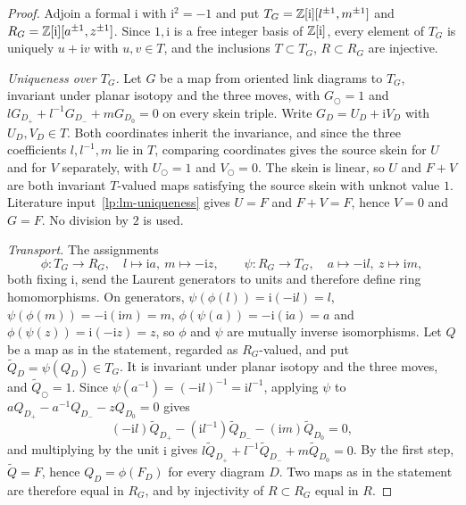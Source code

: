 \begin{proof}
Adjoin a formal $\mathrm i$ with $\mathrm i^2=-1$ and put
$T_G=\mathbb Z[\mathrm i][l^{\pm1},m^{\pm1}]$ and
$R_G=\mathbb Z[\mathrm i][a^{\pm1},z^{\pm1}]$. Since $1,\mathrm i$ is a free
integer basis of $\mathbb Z[\mathrm i]$, every element of $T_G$ is uniquely
$u+\mathrm iv$ with $u,v\in T$, and the inclusions $T\subset T_G$,
$R\subset R_G$ are injective.

\emph{Uniqueness over $T_G$.} Let $G$ be a map from oriented link diagrams
to $T_G$, invariant under planar isotopy and the three moves, with
$G_{\bigcirc}=1$ and $lG_{D_+}+l^{-1}G_{D_-}+mG_{D_0}=0$ on every skein
triple. Write $G_D=U_D+\mathrm iV_D$ with $U_D,V_D\in T$. Both coordinates
inherit the invariance, and since the three coefficients $l,l^{-1},m$ lie
in $T$, comparing coordinates gives the source skein for $U$ and for $V$
separately, with $U_{\bigcirc}=1$ and $V_{\bigcirc}=0$. The skein is linear,
so $U$ and $F+V$ are both invariant $T$-valued maps satisfying the source
skein with unknot value $1$. Literature input~\ref{lp:lm-uniqueness} gives
$U=F$ and $F+V=F$, hence $V=0$ and $G=F$. No division by $2$ is used.

\emph{Transport.} The assignments
\begin{equation}\label{lp:ring-transports}
 \phi:T_G\to R_G,\quad l\mapsto\mathrm ia,\ m\mapsto-\mathrm iz,
 \qquad
 \psi:R_G\to T_G,\quad a\mapsto-\mathrm il,\ z\mapsto\mathrm im,
\end{equation}
both fixing $\mathrm i$, send the Laurent generators to units and therefore
define ring homomorphisms. On generators,
$\psi(\phi(l))=\mathrm i(-\mathrm il)=l$,
$\psi(\phi(m))=-\mathrm i(\mathrm im)=m$,
$\phi(\psi(a))=-\mathrm i(\mathrm ia)=a$ and
$\phi(\psi(z))=\mathrm i(-\mathrm iz)=z$, so $\phi$ and $\psi$ are mutually
inverse isomorphisms. Let $Q$ be a map as in the statement, regarded as
$R_G$-valued, and put $\widetilde Q_D=\psi(Q_D)\in T_G$. It is invariant
under planar isotopy and the three moves, and
$\widetilde Q_{\bigcirc}=1$. Since $\psi(a^{-1})=(-\mathrm il)^{-1}
=\mathrm il^{-1}$, applying $\psi$ to
$aQ_{D_+}-a^{-1}Q_{D_-}-zQ_{D_0}=0$ gives
\begin{equation}\label{lp:transported-skein}
 (-\mathrm il)\widetilde Q_{D_+}-(\mathrm il^{-1})\widetilde Q_{D_-}
 -(\mathrm im)\widetilde Q_{D_0}=0,
\end{equation}
and multiplying by the unit $\mathrm i$ gives
$l\widetilde Q_{D_+}+l^{-1}\widetilde Q_{D_-}+m\widetilde Q_{D_0}=0$.
By the first step, $\widetilde Q=F$, hence $Q_D=\phi(F_D)$ for every
diagram $D$. Two maps as in the statement are therefore equal in $R_G$,
and by injectivity of $R\subset R_G$ equal in $R$.
\end{proof}

